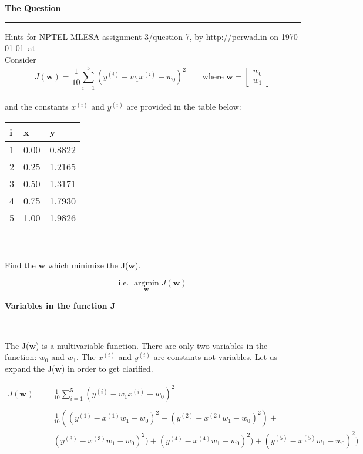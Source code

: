 \documentclass[12pt]{article}
\begin{document}
{\Large \textbf{The Question}} \\
\rule{\textwidth}{1pt}
{\scriptsize Hints for NPTEL MLESA assignment-3/question-7, by \url{http://perwad.in} on \today\ at \currenttime} 
\vspace{20mm} \\
\noindent Consider 
\[
  J(\mathbf{w}) = \frac{1}{10} \sum_{i=1}^{5} (y^{(i)} - w_1x^{(i)} - w_0)^2 \qquad \text{where }
\mathbf{w}
= 
\begin{bmatrix}
    w_0 \\
    w_1
\end{bmatrix}
\]
\vspace{5mm} \\
\noindent and the constants $x^{(i) }$ and $y^{(i) }$ are provided in the table below: \\


\begin{tabular}{ |p{1cm}||p{2cm}|p{2cm}|  }
 \hline
 \textbf{i}& \textbf{x} &\textbf{y}\\
 \hline
 \hline
 1 & 0.00 & 0.8822 \\
 \hline
 2 & 0.25 & 1.2165 \\
 \hline
 3 & 0.50 & 1.3171 \\
 \hline
 4 & 0.75 & 1.7930 \\
 \hline
 5 & 1.00 & 1.9826 \\
\hline
\end{tabular} \\
\\

\noindent Find the $\mathbf{w}$ which minimize the J($\mathbf{w}$). 

\[
    \text{i.e.  } \operatorname*{argmin}_\mathbf{w} J(\mathbf{w})
\]



\break

{\Large \textbf{Variables in the function J}} \\
\rule{\textwidth}{1pt}
\vspace{3mm} \\
The J($\mathbf{w}$) is a multivariable function. There are only two variables in the function: $w_0$ and $w_1$.
The $x^{(i) }$ and $y^{(i) }$ are constants not variables.
Let us expand the J($\mathbf{w}$) in order to get clarified.  


\begin{eqnarray*}
J(\mathbf{w}) & = & \frac{1}{10} \sum_{i=1}^{5} (y^{(i)} - w_1x^{(i)} - w_0)^2 \\
\\
& = & \frac{1}{10} ( (y^{(1)} - x^{(1)}w_1 - w_0)^2 + 
      (y^{(2)} - x^{(2)}w_1 - w_0)^2 ) + \\ 
& &     (y^{(3)} - x^{(3)}w_1 - w_0)^2 ) + 
     (y^{(4)} - x^{(4)}w_1 - w_0)^2 ) + 
      (y^{(5)} - x^{(5)}w_1 - w_0)^2 ) 
\end{eqnarray*}
\end{document}
